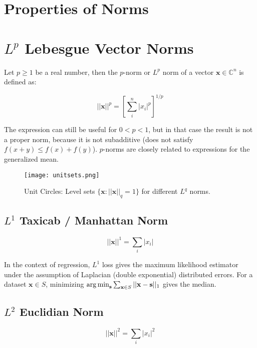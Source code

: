 \section{Properties of Norms}

\section{$L^p$ Lebesgue Vector Norms}
\label{sec:lpnorms}

Let $p\geq1$ be a real number, then the $p$-norm or $L^p$ norm of a vector $\mathbf{x}\in\mathbb{C}^n$ is defined as:

\begin{equation}
||\mathbf{x}||^p = \left[ \sum^n_i |x_i|^p \right]^{1/p}
\end{equation}

The expression can still be useful for $0<p<1$, but in that case the result is not a proper norm, because it is not subadditive (does not satisfy $f(x+y) \leq f(x) + f(y)$). $p$-norms are closely related to expressions for the generalized mean.


\begin{figure}
\centering
    \texttt{[image: unitsets.png]}
    \caption{Unit Circles: Level sets $\{\mathbf{x}: ||\mathbf{x}||_q = 1\}$ for different $L^q$ norms.}
    \label{fig:unitsets}
\end{figure}


\subsection{$L^{1}$ Taxicab / Manhattan Norm}
\label{sec:l1norm}
\begin{equation}
||\mathbf{x}||^1 = \sum_i |x_i|
\end{equation}

In the context of regression, $L^1$ loss gives the maximum likelihood estimator under the assumption of Laplacian (double exponential) distributed errors. For a dataset $\mathbf{x}\in S$, minimizing $\operatorname*{arg\,min}_{\mathbf{s}} \sum_{\mathbf{x}\in S}||\mathbf{x}-\mathbf{s}||_{1}$ gives the median.


\subsection{$L^{2}$ Euclidian Norm}
\label{sec:l2norm}
\begin{equation}
||\mathbf{x}||^2 = \sum_i |x_i|^2
\end{equation}


